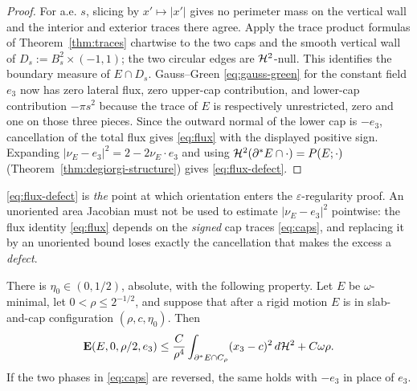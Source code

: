 \begin{proof}
For a.e. $s$, slicing by $x'\mapsto|x'|$ gives no perimeter mass on the
vertical wall and the interior and exterior traces there agree.  Apply the
trace product formulas of Theorem~\ref{thm:traces} chartwise to the two caps
and the smooth vertical wall of
$D_s:=B_s^2\times(-1,1)$; the two circular edges are $\mathcal H^2$-null.  This
identifies the boundary measure of $E\cap D_s$.  Gauss--Green
\eqref{eq:gauss-green} for the constant field $e_3$ now has zero lateral
flux, zero upper-cap contribution, and lower-cap contribution $-\pi s^2$
because the trace of $E$ is respectively unrestricted, zero and one on those
three pieces.  Since the outward normal of the lower cap is $-e_3$,
cancellation of the total flux gives \eqref{eq:flux} with the displayed
positive sign.
Expanding $|\nu_E-e_3|^2=2-2\nu_E\cdot e_3$ and using
$\mathcal H^2(\partial^* E\cap\cdot)=P(E;\cdot)$
(Theorem~\ref{thm:degiorgi-structure}) gives \eqref{eq:flux-defect}.
\end{proof}

\begin{fnote}\label{fnote:orientation-enters}
\eqref{eq:flux-defect} is \emph{the} point at which orientation enters the
$\varepsilon$-regularity proof.  An unoriented area Jacobian must not be used
to estimate $|\nu_E-e_3|^2$ pointwise: the flux identity \eqref{eq:flux}
depends on the \emph{signed} cap traces \eqref{eq:caps}, and replacing it by an
unoriented bound loses exactly the cancellation that makes the excess a
\emph{defect}.
\end{fnote}

\begin{lemma}\label{lem:reverse-poincare}
There is $\eta_0\in(0,1/2)$, absolute, with the following property.  Let $E$ be
$\omega$-minimal, let $0<\rho\le2^{-1/2}$, and suppose that after a rigid
motion $E$ is in slab-and-cap configuration $(\rho,c,\eta_0)$.  Then
\begin{equation}\label{eq:reverse-poincare}
  \operatorname{\mathbf E}(E,0,\rho/2,e_3)
  \le\frac{C}{\rho^4}\int_{\partial^* E\cap C_\rho}(x_3-c)^2\,d\mathcal H^2
   +C\omega\rho .
\end{equation}
If the two phases in \eqref{eq:caps} are reversed, the same holds with
$-e_3$ in place of $e_3$.
\end{lemma}

